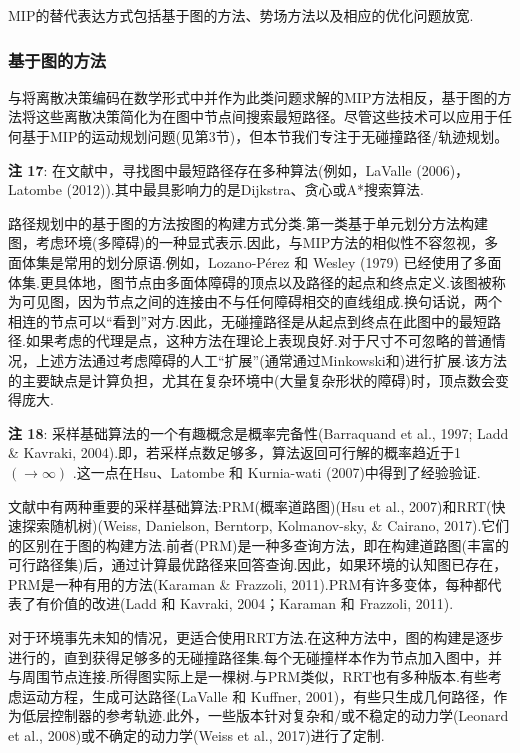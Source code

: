 \documentclass[10pt]{article}
\begin{document}
MIP的替代表达方式包括基于图的方法、势场方法以及相应的优化问题放宽.

\subsubsection{基于图的方法}
与将离散决策编码在数学形式中并作为此类问题求解的MIP方法相反，基于图的方法将这些离散决策简化为在图中节点间搜索最短路径。尽管这些技术可以应用于任何基于MIP的运动规划问题(见第3节)，但本节我们专注于无碰撞路径/轨迹规划。

\vspace{1 em}
\noindent\textbf{注 17}: 在文献中，寻找图中最短路径存在多种算法(例如，LaValle (2006)，Latombe (2012)).其中最具影响力的是Dijkstra、贪心或A*搜索算法.
\vspace{1 em}

路径规划中的基于图的方法按图的构建方式分类.第一类基于单元划分方法构建图，考虑环境(多障碍)的一种显式表示.因此，与MIP方法的相似性不容忽视，多面体集是常用的划分原语.例如，Lozano-Pérez 和 Wesley (1979) 已经使用了多面体集.更具体地，图节点由多面体障碍的顶点以及路径的起点和终点定义.该图被称为可见图，因为节点之间的连接由不与任何障碍相交的直线组成.换句话说，两个相连的节点可以“看到”对方.因此，无碰撞路径是从起点到终点在此图中的最短路径.如果考虑的代理是点，这种方法在理论上表现良好.对于尺寸不可忽略的普通情况，上述方法通过考虑障碍的人工“扩展”(通常通过Minkowski和)进行扩展.该方法的主要缺点是计算负担，尤其在复杂环境中(大量复杂形状的障碍)时，顶点数会变得庞大.

\vspace{1 em}
\noindent\textbf{注 18}: 采样基础算法的一个有趣概念是概率完备性(Barraquand et al., 1997; Ladd \& Kavraki, 2004).即，若采样点数足够多，算法返回可行解的概率趋近于1 \(\left( { \rightarrow  \infty }\right)\) .这一点在Hsu、Latombe 和 Kurnia-wati (2007)中得到了经验验证.
\vspace{1 em}

文献中有两种重要的采样基础算法:PRM(概率道路图)(Hsu et al., 2007)和RRT(快速探索随机树)(Weiss, Danielson, Berntorp, Kolmanov-sky, \& Cairano, 2017).它们的区别在于图的构建方法.前者(PRM)是一种多查询方法，即在构建道路图(丰富的可行路径集)后，通过计算最优路径来回答查询.因此，如果环境的认知图已存在，PRM是一种有用的方法(Karaman \& Frazzoli, 2011).PRM有许多变体，每种都代表了有价值的改进(Ladd 和 Kavraki, 2004；Karaman 和 Frazzoli, 2011).

对于环境事先未知的情况，更适合使用RRT方法.在这种方法中，图的构建是逐步进行的，直到获得足够多的无碰撞路径集.每个无碰撞样本作为节点加入图中，并与周围节点连接.所得图实际上是一棵树.与PRM类似，RRT也有多种版本.有些考虑运动方程，生成可达路径(LaValle 和 Kuffner, 2001)，有些只生成几何路径，作为低层控制器的参考轨迹.此外，一些版本针对复杂和/或不稳定的动力学(Leonard et al., 2008)或不确定的动力学(Weiss et al., 2017)进行了定制.
\end{document}
